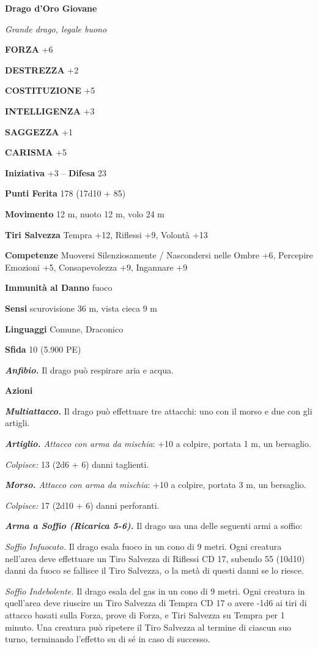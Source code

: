 \begin{multicols}{2}
\medskip{}\textbf{Drago d'Oro Giovane}

\emph{Grande drago, legale buono}

\textbf{FORZA} +6

\textbf{DESTREZZA} +2

\textbf{COSTITUZIONE} +5

\textbf{INTELLIGENZA} +3

\textbf{SAGGEZZA} +1

\textbf{CARISMA} +5

\textbf{Iniziativa} +3 -- \textbf{Difesa} 23

\textbf{Punti Ferita} 178 (17d10 + 85)

\textbf{Movimento} 12 m, nuoto 12 m, volo 24 m

\textbf{Tiri Salvezza} Tempra +12, Riflessi +9, Volontà +13

\textbf{Competenze} Muoversi Silenziosamente / Nascondersi nelle Ombre +6, Percepire Emozioni +5, Consapevolezza +9, Ingannare +9

\textbf{Immunità al Danno} fuoco

\textbf{Sensi} scurovisione 36 m, vista cieca 9 m

\textbf{Linguaggi} Comune, Draconico

\textbf{Sfida} 10 (5.900 PE)

\emph{\textbf{Anfibio.}} Il drago può respirare aria e acqua.

\textbf{Azioni}

\emph{\textbf{Multiattacco.}} Il drago può effettuare tre attacchi: uno con il morso e due con gli artigli.

\emph{\textbf{Artiglio.} Attacco con arma da mischia}: +10 a colpire, portata 1 m, un bersaglio.

\emph{Colpisce:} 13 (2d6 + 6) danni taglienti.

\emph{\textbf{Morso.} Attacco con arma da mischia}: +10 a colpire, portata 3 m, un bersaglio.

\emph{Colpisce:} 17 (2d10 + 6) danni perforanti.

\emph{\textbf{Arma a Soffio (Ricarica 5-6).}} Il drago usa una delle seguenti armi a soffio:

\emph{Soffio Infuocato.} Il drago esala fuoco in un cono di 9 metri. Ogni creatura nell'area deve effettuare un Tiro Salvezza di Riflessi CD 17, subendo 55 (10d10) danni da fuoco se fallisce il Tiro Salvezza, o la metà di questi danni se lo riesce.

\emph{Soffio Indebolente.} Il drago esala del gas in un cono di 9 metri. Ogni creatura in quell'area deve riuscire un Tiro Salvezza di Tempra CD 17 o avere -1d6 ai tiri di attacco basati sulla Forza, prove di Forza, e Tiri Salvezza su Tempra per 1 minuto. Una creatura può ripetere il Tiro Salvezza al termine di ciascun suo turno, terminando l'effetto su di sé in caso di successo.


\end{multicols}
